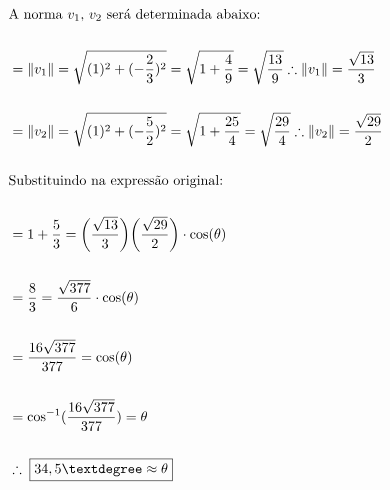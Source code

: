 \documentclass[
]{article}
\begin{document}
\begin{enumerate}
\[\begin{flalign*}
  &\text{A norma $v_1,\,v_2$ será determinada abaixo:}&& \\ \\
  &=\|v_1\|=\sqrt{(1)^2+(-\frac{2}{3})^2}=\sqrt{1+\frac{4}{9}}=\sqrt{\frac{13}{9}}\therefore\|v_1\|=\frac{\sqrt{13}}{3}&& \\ \\
  &=\|v_2\|=\sqrt{(1)^2+(-\frac{5}{2})^2}=\sqrt{1+\frac{25}{4}}=\sqrt{\frac{29}{4}}\therefore\|v_2\|=\frac{\sqrt{29}}{2}&& \\ \\
  &\text{Substituindo na expressão original:}&& \\ \\
  &=1+\frac{5}{3}=\bigg(\frac{\sqrt{13}}{3}\bigg)\bigg(\frac{\sqrt{29}}{2}\bigg)\cdot\cos(\theta)&& \\ \\
  &=\frac{8}{3}=\frac{\sqrt{377}}{6}\cdot\cos(\theta)&& \\ \\
  &=\frac{16\sqrt{377}}{377}=\cos(\theta)&& \\ \\
  &=\cos^{-1}(\frac{16\sqrt{377}}{377})=\theta&& \\ \\
  &\therefore\;\boxed{34,5\textdegree\approx\theta}&&
  \end{flalign*}
  \]
\end{enumerate}
\end{document}
